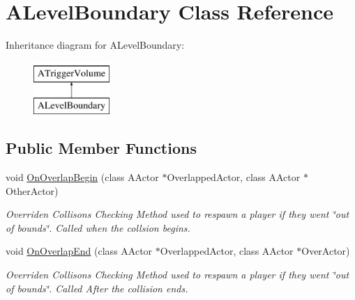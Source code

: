 \hypertarget{class_a_level_boundary}{}\section{A\+Level\+Boundary Class Reference}
\label{class_a_level_boundary}
Inheritance diagram for A\+Level\+Boundary\+:\begin{figure}[H]
\begin{center}
\leavevmode
\includegraphics[height=2.000000cm]{class_a_level_boundary}
\end{center}
\end{figure}
\subsection*{Public Member Functions}
\begin{DoxyCompactItemize}
\item 
\mbox{\label{class_a_level_boundary_af75a32e183b2fb04f37ef82596e7c812}} 
void \mbox{\hyperlink{class_a_level_boundary_af75a32e183b2fb04f37ef82596e7c812}{On\+Overlap\+Begin}} (class A\+Actor $\ast$Overlapped\+Actor, class A\+Actor $\ast$Other\+Actor)
\begin{DoxyCompactList}\small\item\em Overriden Collisons Checking Method used to respawn a player if they went \char`\"{}out of bounds\char`\"{}. Called when the collsion begins. \end{DoxyCompactList}\item 
\mbox{\label{class_a_level_boundary_a60671f338cc8ec077390965d975e0b20}} 
void \mbox{\hyperlink{class_a_level_boundary_a60671f338cc8ec077390965d975e0b20}{On\+Overlap\+End}} (class A\+Actor $\ast$Overlapped\+Actor, class A\+Actor $\ast$Over\+Actor)
\begin{DoxyCompactList}\small\item\em Overriden Collisons Checking Method used to respawn a player if they went \char`\"{}out of bounds\char`\"{}. Called After the collision ends. \end{DoxyCompactList}\end{DoxyCompactItemize}
